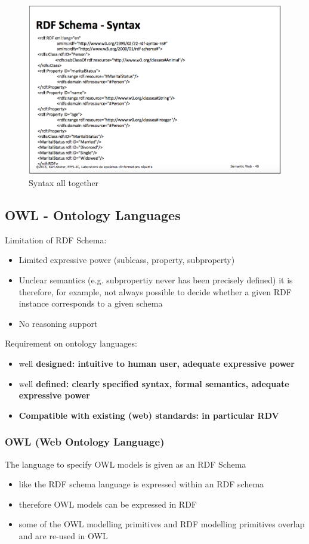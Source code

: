 \begin{figure}[H]
\begin{center}
\includegraphics[width=1\linewidth]{figures/rdf_syntax.png}
\end{center}
\caption{Syntax all together}
\label{fig:class}
\end{figure}

\subsection{OWL - Ontology Languages}
Limitation of RDF Schema:
\begin{itemize}
	\item Limited expressive power (sublcass, property, subproperty)
	\item Unclear semantics (e.g. subpropertiy never has been precisely defined) it is therefore, for example, not always possible to decide whether a given RDF instance corresponds to a given schema
	\item No reasoning support
\end{itemize}

Requirement on ontology languages:
\begin{itemize}
	\item well \bf{designed}: intuitive to human user, adequate expressive power
	\item well \bf{defined}: clearly specified syntax, formal semantics, adequate expressive power
	\item \bf{Compatible} with existing (web) standards: in particular RDV
\end{itemize}

\subsubsection{OWL (Web Ontology Language)}
The language to specify OWL models is given as an RDF Schema
\begin{itemize}
	\item like the RDF schema language is expressed within an RDF schema
	\item therefore OWL models can be expressed in RDF
	\item some of the OWL modelling primitives and RDF modelling primitives overlap and are re-used in OWL 
\end{itemize}

